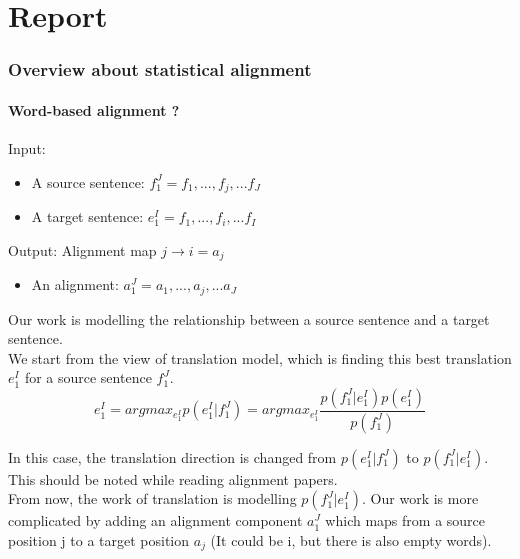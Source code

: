 \documentclass{article}
\begin{document}
\pagebreak 
\part{Report}

\section{Overview about statistical alignment }

\subsection{Word-based alignment ? \cite{Och2003Systematic}}
Input:
\begin{itemize}
\item A source sentence: $f_1^J = f_1,...,f_j,...f_J$
\item A target sentence: $e_1^I = f_1,...,f_i,...f_I$
\end{itemize}
Output: Alignment map $j \rightarrow i = a_j$
\begin{itemize}
\item An alignment: $a_1^J = a_1,...,a_j,...a_J$
\end{itemize}


Our work is modelling the relationship between a source sentence and a target sentence. \\
We start from the view of translation model, which is finding this best translation $e_1^I$ for a source sentence $f_1^J$.
\begin{equation}
e_1^I = argmax_{e_1^I} p(e_1^I|f_1^J) = argmax_{e_1^I} \frac{p(f_1^J|e_1^I)p(e_1^I)}{p(f_1^J)}
\end{equation}

In this case, the translation direction is changed from $p(e_1^I|f_1^J)$ to $p(f_1^J|e_1^I)$. This should be noted while reading alignment papers. \\

From now, the work of translation is modelling $p(f_1^J|e_1^I)$. Our work is more complicated by adding an alignment component $a_1^J$ which maps from a source position j to a target position $a_j$ (It could be i, but there is also empty words).

\begin{equation}
\end{equation}
\end{document}

